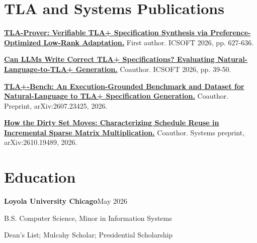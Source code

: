 \documentclass[letterpaper,10pt]{article}
\begin{document}
\section*{TLA and Systems Publications}
\href{https://doi.org/10.5220/0015234600004088}{\textbf{TLA-Prover: Verifiable TLA+ Specification Synthesis via Preference-Optimized Low-Rank Adaptation.}} First author. ICSOFT 2026, pp. 627-636.\par
\href{https://doi.org/10.5220/0015070400004088}{\textbf{Can LLMs Write Correct TLA+ Specifications? Evaluating Natural-Language-to-TLA+ Generation.}} Coauthor. ICSOFT 2026, pp. 39-50.\par
\href{https://arxiv.org/abs/2607.23425}{\textbf{TLA+-Bench: An Execution-Grounded Benchmark and Dataset for Natural-Language to TLA+ Specification Generation.}} Coauthor. Preprint, arXiv:2607.23425, 2026.\par
\href{https://arxiv.org/abs/2610.19489}{\textbf{How the Dirty Set Moves: Characterizing Schedule Reuse in Incremental Sparse Matrix Multiplication.}} Coauthor. Systems preprint, arXiv:2610.19489, 2026.\par
\section*{Education}
\textbf{Loyola University Chicago}\hfill May 2026\par
B.S. Computer Science, Minor in Information Systems\par
Dean's List; Mulcahy Scholar; Presidential Scholarship\par
{}
\end{document}
